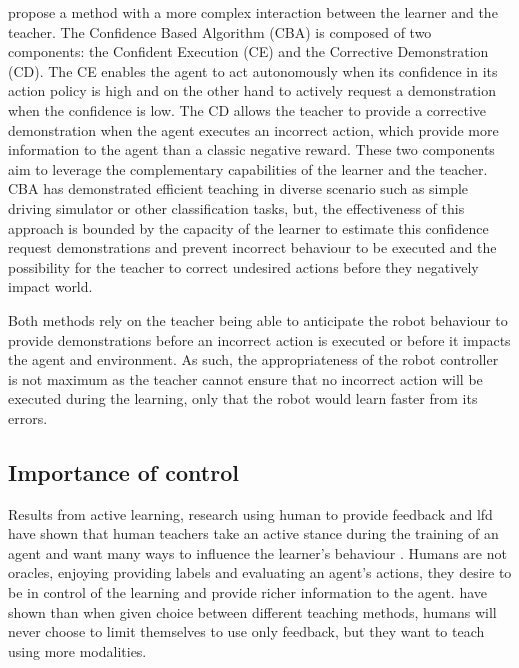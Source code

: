\cite{chernova2009interactive} propose a method with a more complex interaction between the learner and the teacher. The Confidence Based Algorithm (CBA) is composed of two components: the Confident Execution (CE) and the Corrective Demonstration (CD). The CE enables the agent to act autonomously when its confidence in its action policy is high and on the other hand to actively request a demonstration when the confidence is low. The CD allows the teacher to provide a corrective demonstration when the agent executes an incorrect action, which provide more information to the agent than a classic negative reward. These two components aim to leverage the complementary capabilities of the learner and the teacher. CBA has demonstrated efficient teaching in diverse scenario such as simple driving simulator or other classification tasks, but, the effectiveness of this approach is bounded by the capacity of the learner to estimate this confidence request demonstrations and prevent incorrect behaviour to be executed and the possibility for the teacher to correct undesired actions before they negatively impact world. 

Both methods rely on the teacher being able to anticipate the robot behaviour to provide demonstrations before an incorrect action is executed or before it impacts the agent and environment. As such, the appropriateness of the robot controller is not maximum as the teacher cannot ensure that no incorrect action will be executed during the learning, only that the robot would learn faster from its errors.

\subsection{Importance of control}

Results from active learning, research using human to provide feedback and \gls{lfd} have shown that human teachers take an active stance during the training of an agent and want many ways to influence the learner's behaviour \citep{amershi2014power}. Humans are not oracles, enjoying providing labels and evaluating an agent's actions, they desire to be in control of the learning and provide richer information to the agent. \cite{kaochar2011towards} have shown than when given choice between different teaching methods, humans will never choose to limit themselves to use only feedback, but they want to teach using more modalities.


